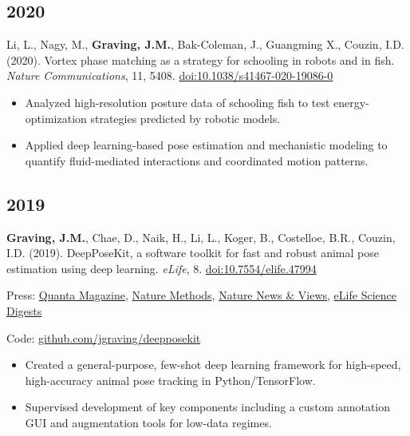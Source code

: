 \documentclass[10pt,a4paper]{article}
\begin{document}
\subsection*{2020}
Li, L., Nagy, M., \textbf{Graving, J.M.}, Bak-Coleman, J., Guangming X., Couzin, I.D. (2020). Vortex phase matching as a strategy for schooling in robots and in fish. \textit{Nature Communications}, 11, 5408. \href{https://doi.org/10.1038/s41467-020-19086-0}{doi:10.1038/s41467-020-19086-0}\par
\begin{itemize}
\item Analyzed high-resolution posture data of schooling fish to test energy-optimization strategies predicted by robotic models.
\item Applied deep learning-based pose estimation and mechanistic modeling to quantify fluid-mediated interactions and coordinated motion patterns.
\end{itemize}
\subsection*{2019}
\textbf{Graving, J.M.}, Chae, D., Naik, H., Li, L., Koger, B., Costelloe, B.R., Couzin, I.D. (2019). DeepPoseKit, a software toolkit for fast and robust animal pose estimation using deep learning. \textit{eLife}, 8. \href{https://doi.org/10.7554/elife.47994}{doi:10.7554/elife.47994}\par
Press: \href{https://www.quantamagazine.org/to-decode-the-brain-scientists-automate-the-study-of-behavior-20191210/}{Quanta Magazine}, \href{https://doi.org/10.1038/s41592-019-0678-2}{Nature Methods}, \href{https://doi.org/10.1038/d41586-019-02942-5}{Nature News \& Views}, \href{https://elifesciences.org/digests/47994/machine-learning-animal-poses-to-understand-behavior}{eLife Science Digests}\par
Code: \href{https://github.com/jgraving/deepposekit}{github.com/jgraving/deepposekit}\par
\begin{itemize}
\item Created a general-purpose, few-shot deep learning framework for high-speed, high-accuracy animal pose tracking in Python/TensorFlow.
\item Supervised development of key components including a custom annotation GUI and augmentation tools for low-data regimes.
\end{itemize}
\end{document}
